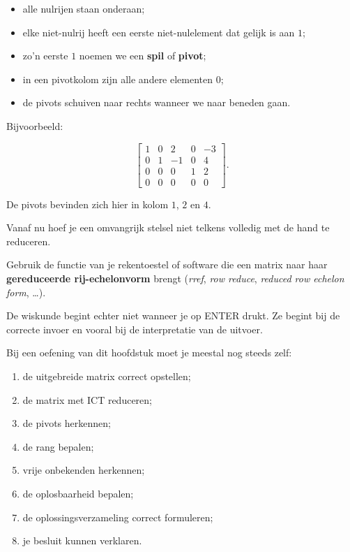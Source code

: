\documentclass{ximera}
\begin{document}
\begin{itemize}
    \item alle nulrijen staan onderaan;
    \item elke niet-nulrij heeft een eerste niet-nulelement dat gelijk is aan \(1\);
    \item zo'n eerste \(1\) noemen we een \textbf{spil} of \textbf{pivot};
    \item in een pivotkolom zijn alle andere elementen \(0\);
    \item de pivots schuiven naar rechts wanneer we naar beneden gaan.
\end{itemize}


Bijvoorbeeld:

\[
\begin{bmatrix}
1&0&2&0&-3\\
0&1&-1&0&4\\
0&0&0&1&2\\
0&0&0&0&0
\end{bmatrix}.
\]

De pivots bevinden zich hier in kolom \(1\), \(2\) en \(4\).





Vanaf nu hoef je een omvangrijk stelsel niet telkens volledig met de hand
te reduceren.

Gebruik de functie van je rekentoestel of software die een matrix naar
haar \textbf{gereduceerde rij-echelonvorm} brengt
(\emph{rref}, \emph{row reduce}, \emph{reduced row echelon form}, \ldots).

De wiskunde begint echter niet wanneer je op ENTER drukt.
Ze begint bij de correcte invoer en vooral bij de interpretatie van de uitvoer.


\begin{opmerking}

Bij een oefening van dit hoofdstuk moet je meestal nog steeds zelf:

\begin{enumerate}
    \item de uitgebreide matrix correct opstellen;
    \item de matrix met ICT reduceren;
    \item de pivots herkennen;
    \item de rang bepalen;
    \item vrije onbekenden herkennen;
    \item de oplosbaarheid bepalen;
    \item de oplossingsverzameling correct formuleren;
    \item je besluit kunnen verklaren.
\end{enumerate}
\end{opmerking}
\end{document}
